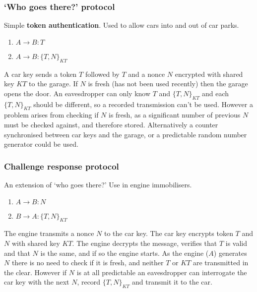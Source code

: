 \documentclass{article}
\begin{document}
\subsubsection{`Who goes there?' protocol}
Simple \textbf{token authentication}. Used to allow cars into and out of car parks.
\begin{enumerate}
	\item $ A \rightarrow B : T $
	\item $ A \rightarrow B : \{ T, N \}_{KT} $
\end{enumerate}
A car key sends a token $ T $ followed by $ T $ and a nonce $ N $ encrypted with shared key $ KT $ to the garage. If $ N $ is fresh (has not been used recently) then the garage opens the door. An eavesdropper can only know $ T $ and $ \{ T, N \}_{KT} $ and each $ \{ T, N \}_{KT} $ should be different, so a recorded transmission can't be used. However a problem arises from checking if $ N $ is fresh, as a significant number of previous $ N $ must be checked against, and therefore stored. Alternatively a counter synchronised between car keys and the garage, or a predictable random number generator could be used.

\subsubsection{Challenge response protocol}
An extension of `who goes there?' Use in engine immobilisers.
\begin{enumerate}
	\item $ A \rightarrow B : N $
	\item $ B \rightarrow A : \{ T, N \}_{KT} $
\end{enumerate}
The engine transmits a nonce $ N $ to the car key. The car key encrypts token $ T $ and $ N $ with shared key $ KT $. The engine decrypts the message, verifies that $ T $ is valid and that $ N $ is the same, and if so the engine starts. As the engine ($ A $) generates $ N $ there is no need to check if it is fresh, and neither $ T $ or $ KT $ are transmitted in the clear. However if $ N $ is at all predictable an eavesdropper can interrogate the car key with the next $ N $, record $ \{ T, N \}_{KT} $ and transmit it to the car.
\end{document}
